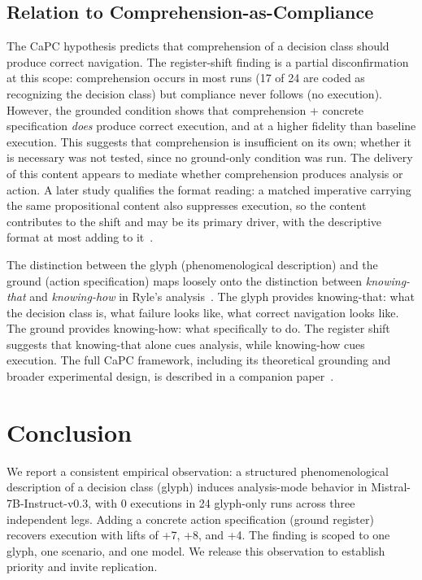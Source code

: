 \documentclass[11pt,a4paper]{article}
\begin{document}
\subsection{Relation to Comprehension-as-Compliance}

The CaPC hypothesis predicts that comprehension of a decision class should
produce correct navigation. The register-shift finding is a partial
disconfirmation at this scope: comprehension
occurs in most runs (17 of 24 are coded as recognizing the decision class)
but compliance never follows (no execution). However, the
grounded condition shows that comprehension + concrete specification
\emph{does} produce correct execution, and at a higher fidelity than baseline
execution. This suggests that
comprehension is insufficient on its own; whether it is necessary was not
tested, since no ground-only condition was run. The delivery of this content
appears to mediate whether comprehension produces analysis or action. A later
study qualifies the format reading: a matched imperative carrying the same
propositional content also suppresses execution, so the content contributes to
the shift and may be its primary driver, with the descriptive format at most
adding to it~\citep{neilson2026content}.

The distinction between the glyph (phenomenological description) and the ground
(action specification) maps loosely onto the distinction between
\emph{knowing-that} and \emph{knowing-how} in Ryle's analysis~\citep{ryle1949}.
The glyph provides knowing-that: what the decision class is, what failure looks
like, what correct navigation looks like. The ground provides knowing-how: what
specifically to do. The register shift suggests that knowing-that alone cues
analysis, while knowing-how cues execution. The full CaPC framework, including
its theoretical grounding and broader experimental design, is described in a
companion paper~\citep{neilson2026capc}.

\section{Conclusion}

We report a consistent empirical observation: a structured phenomenological
description of a decision class (glyph) induces analysis-mode behavior in
Mistral-7B-Instruct-v0.3, with 0 executions in 24 glyph-only runs across
three independent legs. Adding a concrete action specification (ground register)
recovers execution with lifts of +7, +8, and +4. The finding is scoped to one
glyph, one scenario, and one model. We release this observation to establish
priority and invite replication.
\end{document}
